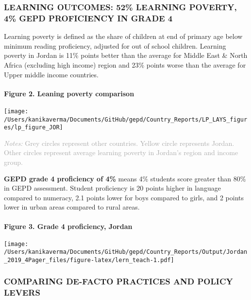 \documentclass[
  twocolumn]{article}
\begin{document}
\hypertarget{learning-outcomes-52-learning-poverty-4-gepd-proficiency-in-grade-4}{%
\subsubsection{\texorpdfstring{\textbf{LEARNING OUTCOMES: 52\% LEARNING
POVERTY, 4\% GEPD PROFICIENCY IN GRADE
4}}{LEARNING OUTCOMES: 52\% LEARNING POVERTY, 4\% GEPD PROFICIENCY IN GRADE 4}}\label{learning-outcomes-52-learning-poverty-4-gepd-proficiency-in-grade-4}}

Learning poverty is defined as the share of children at end of primary
age below minimum reading proficiency, adjusted for out of school
children. Learning poverty in Jordan is 11\% points better than the
average for Middle East \& North Africa (excluding high income) region
and 23\% points worse than the average for Upper middle income
countries.

\hypertarget{figure-2.-leaning-poverty-comparison}{%
\paragraph{Figure 2. Leaning poverty
comparison}\label{figure-2.-leaning-poverty-comparison}}

\texttt{[image: /Users/kanikaverma/Documents/GitHub/gepd/Country\_Reports/LP\_LAYS\_figures/lp\_figure\_JOR]}

{\scriptsize
    \textcolor{darkgray}{\textit{Notes:} Grey circles represent other countries. Yellow circle represents Jordan. Other circles represent average learning poverty in Jordan's region and income group.}
  }

\textbf{GEPD grade 4 proficiency of 4\%} means 4\% students score
greater than 80\% in GEPD assessment. Student proficiency is 20 points
higher in language compared to numeracy, 2.1 points lower for boys
compared to girls, and 2 points lower in urban areas compared to rural
areas. \vfill\null

\hypertarget{figure-3.-grade-4-proficiency-jordan}{%
\paragraph{Figure 3. Grade 4 proficiency,
Jordan}\label{figure-3.-grade-4-proficiency-jordan}}

\texttt{[image: /Users/kanikaverma/Documents/GitHub/gepd/Country\_Reports/Output/Jordan\_2019\_4Pager\_files/figure-latex/lern\_teach-1.pdf]}

\hypertarget{comparing-de-facto-practices-and-policy-levers}{%
\subsubsection{\texorpdfstring{\textbf{COMPARING DE-FACTO PRACTICES AND
POLICY
LEVERS}}{COMPARING DE-FACTO PRACTICES AND POLICY LEVERS}}\label{comparing-de-facto-practices-and-policy-levers}}
\end{document}
